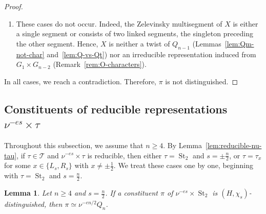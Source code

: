 \documentclass[11pt]{amsart}
\numberwithin{equation}{section}
\theoremstyle{plain}
\newtheorem{lemma}[theorem]{Lemma}
\theoremstyle{definition}
\theoremstyle{remark}
\newcommand{\T}{\mathcal{T}}
\DeclareMathOperator{\St}{St}
\begin{document}
\begin{proof}
\begin{enumerate}[label=(\alph*)]
		\item[\textup{(d), (e)}] These cases do not occur. Indeed, the Zelevinsky multisegment of $X$ is either a single segment or consists of two linked segments, the singleton preceding the other segment. Hence, $X$ is neither a twist of $Q_{n-1}$ (Lemmas~\ref{lem:Qm-not-char} and~\ref{lem:Q-vs-Qt}) nor an irreducible representation induced from $G_1\times G_{n-2}$ (Remark~\ref{rem:O-characters}).
	\end{enumerate}
	In all cases, we reach a contradiction. Therefore, $\pi$ is not distinguished.
\end{proof}

\subsection{Constituents of reducible representations \texorpdfstring{$\nu^{-es}\times\tau$}{nu times tau}}\label{ss:constituents-reducible}

Throughout this subsection, we assume that $n\ge4$. By Lemma~\ref{lem:reducible-nu-tau}, if $\tau\in\T$ and $\nu^{-es}\times\tau$ is reducible, then either $\tau=\St_2$ and $s=\pm\frac n2$, or $\tau=\tau_x$ for some $x\in\{L_s,R_s\}$ with $x\ne\pm\frac12$. We treat these cases one by one, beginning with $\tau=\St_2$ and $s=\frac n2$.

\begin{lemma}\label{lem:constituents-St2-plus}
	Let $n\ge4$ and $s=\frac n2$. If a constituent $\pi$ of $\nu^{-es}\times\St_2$ is $(H,\chi_s)$-distinguished, then $\pi\simeq\nu^{-en/2}Q_n$.
\end{lemma}
\end{document}
